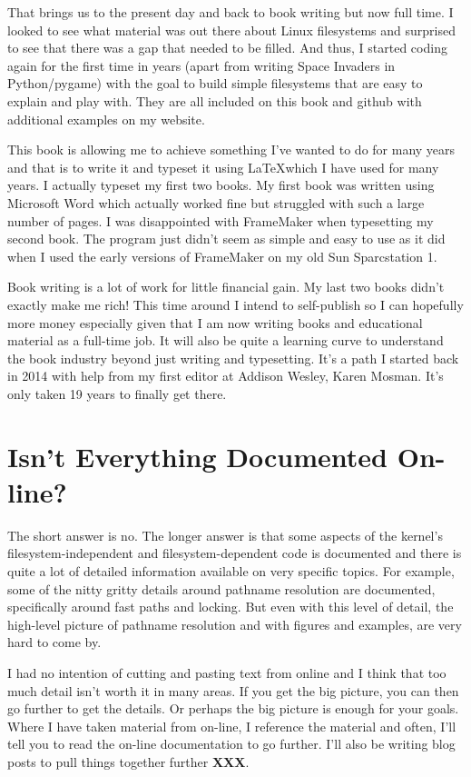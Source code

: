 That brings us to the present day and back to book writing but now full time. I looked to see what material was out there about Linux filesystems and surprised to see that there was a gap that needed to be filled. And thus, I started coding again for the first time in years (apart from writing Space Invaders in Python/pygame) with the goal to build simple filesystems that are easy to explain and play with. They are all included on this book and github with additional examples on my website.

This book is allowing me to achieve something I've wanted to do for many years and that is to write it and typeset it using \LaTeX which I have used for many years. I actually typeset my first two books. My first book was written using Microsoft Word which actually worked fine but struggled with such a large number of pages. I was disappointed with FrameMaker when typesetting my second book. The program just didn't seem as simple and easy to use as it did when I used the early versions of FrameMaker on my old Sun Sparcstation 1. 

Book writing is a lot of work for little financial gain. My last two books didn't exactly make me rich! This time around I intend to self-publish so I can hopefully more money especially given that I am now writing books and educational material as a full-time job. It will also be quite a learning curve to understand the book industry beyond just writing and typesetting. It's a path I started back in 2014 with help from my first editor at Addison Wesley, Karen Mosman. It's only taken 19 years to finally get there.


\section{Isn't Everything Documented On-line?}

The short answer is no. The longer answer is that some aspects of the kernel's filesystem-independent and filesystem-dependent code is documented and there is quite a lot of detailed information available on very specific topics. For example, some of the nitty gritty details around pathname resolution are documented, specifically around fast paths and locking. But even with this level of detail, the high-level picture of pathname resolution and with figures and examples, are very hard to come by.

I had no intention of cutting and pasting text from online and I think that too much detail isn't worth it in many areas. If you get the big picture, you can then go further to get the details. Or perhaps the big picture is enough for your goals. Where I have taken material from on-line, I reference the material and often, I'll tell you to read the on-line documentation to go further. I'll also be writing blog posts to pull things together further \textbf{XXX}.

